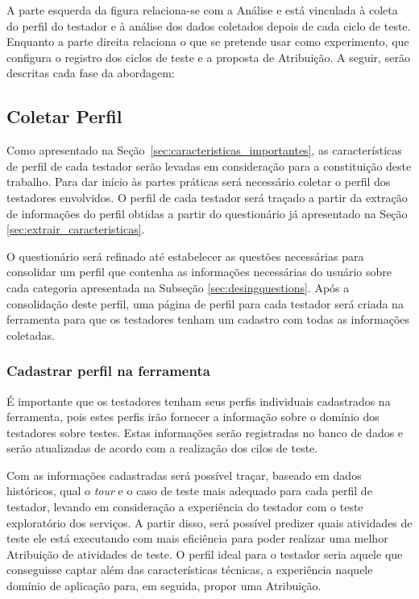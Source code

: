 A parte esquerda da figura relaciona-se com a Análise e está vinculada à coleta do perfil do testador e à análise dos dados coletados depois de cada ciclo de teste. Enquanto a parte direita relaciona o que se pretende usar como experimento, que configura o registro dos ciclos de teste e a proposta de Atribuição. A seguir, serão descritas cada fase da abordagem:

\subsection{Coletar Perfil}

Como apresentado na Seção~\ref{sec:caracteristicas_importantes}, as características de perfil de cada testador serão levadas em consideração para a constituição deste trabalho. Para dar início às partes práticas será necessário coletar o perfil dos testadores envolvidos. O perfil de cada testador será traçado a partir da extração de informações do perfil obtidas a partir do questionário já apresentado na Seção \ref{sec:extrair_caracteristicas}.

O questionário será refinado até estabelecer as questões necessárias para consolidar um perfil que contenha as informações necessárias do usuário sobre cada categoria apresentada na Subseção \ref{sec:desingquestions}. Após a consolidação deste perfil, uma página de perfil para cada testador será criada na ferramenta \itractool para que os testadores tenham um cadastro com todas as informações coletadas.

\subsubsection{Cadastrar perfil na ferramenta \itractool}

É importante que os testadores tenham seus perfis individuais cadastrados na ferramenta, pois estes perfis irão fornecer a informação sobre o domínio dos testadores sobre testes. Estas informações serão registradas no banco de dados e serão atualizadas de acordo com a realização dos cilos de teste.

Com as informações cadastradas será possível traçar, baseado em dados históricos, qual o \textit{tour} e o caso de teste mais adequado para cada perfil de testador, levando em consideração a experiência do testador com o teste exploratório dos serviços. A partir disso, será possível predizer quais atividades de teste ele está executando com mais eficiência para poder realizar uma melhor Atribuição de atividades de teste. O perfil ideal para o testador seria aquele que conseguisse captar além das características técnicas, a experiência naquele domínio de aplicação para, em seguida, propor uma Atribuição.

